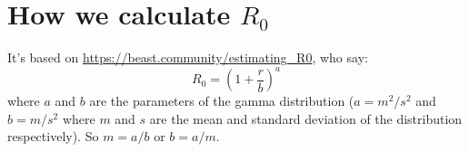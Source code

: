 \documentclass{article}
\begin{document}
\section*{How we calculate $R_0$}
It's based on \url{https://beast.community/estimating_R0}, who say:
$$ R_{0}=\left(1+\frac{r}{b}\right)^{a} $$
where $a$ and $b$ are the parameters of the gamma distribution ($ a =
m^{2}/s^{2} $ and $ b = m/s^{2} $ where $ m $ and $ s $ are the mean
and standard deviation of the distribution respectively).
So $m = a/b$ or $b= a/m$.
\end{document}
